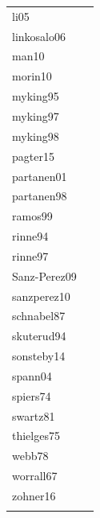 \documentclass{article}
\begin{document}
\begin{footnotesize}
\begin{longtable}{p{}p{}}
  li05 & \citep{Li:2005aa} \\ 
  linkosalo06 & \citep{Linkosalo:2006aa} \\ 
  man10 & \citep{Man:2010aa} \\ 
  morin10 & \citep{Morin:2010aa} \\ 
  myking95 & \citep{Myking:1995} \\ 
  myking97 & \citep{Myking:1997aa} \\ 
  myking98 & \citep{Myking:1998aa} \\ 
  pagter15 & \citep{Pagter:2015} \\ 
  partanen01 & \citep{Partanen:2001aa} \\ 
  partanen98 & \citep{Partanen:1998aa} \\ 
  ramos99 & \citep{ramos:1999} \\ 
  rinne94 & \citep{Rinne:1994} \\ 
 rinne97 & \citep{Rinne:1997aa} \\ 
 Sanz-Perez09 & \citep{Sanz-Perez:2009aa} \\ 
 sanzperez10 & \citep{Sanz-Perez:2010aa} \\ 
  schnabel87 & \citep{Schnabel:1987aa} \\ 
 skuterud94 & \citep{Skuterud:1994aa} \\ 
 sonsteby14 & \citep{Sonsteby:2014aa} \\ 
 spann04  & \citep{Spann:2004aa} \\ 
 spiers74 & \citep{Spiers:1974aa} \\ 
 swartz81 & \citep{Swartz:1981aa} \\ 
 thielges75 & \citep{Thielges:1976aa} \\ 
 webb78 & \citep{Webb:1977} \\ 
 worrall67 & \citep{Worrall:1967aa} \\ 
 zohner16 & \citep{zohner2016} \\ 
  \hline
\label{tab:ref}
\end{longtable}
\endgroup
\pagebreak


\end{footnotesize}
\end{document}
